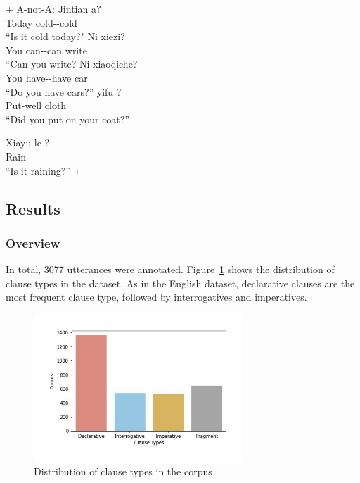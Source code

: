 + A-not-A: 
\bxl
\gll Jintian  a?\\
Today cold-\Neg-cold \Sfp{}\\
\trans ``Is it cold today?" \hfill {}
\ex 
\gll Ni  xiezi?\\
You can-\Neg-can write\\
\trans ``Can you write? \hfill {}
\ex \gll Ni  xiaoqiche?\\
You have-\Neg-have car\\
\trans ``Do you have cars?'' \hfill {}
\ex 
\gll {} yifu ?\\
Put-well cloth \Neg{}\\
\trans ``Did you put on your coat?'' \hfill {}
\exl
\eex

\gll Xiayu le ?\\
Rain \Asp{} \\
\trans ``Is it raining?'' \hfill +
\eex

\subsection{Results}
\label{sec:mancl:corpus:results}

\subsubsection{Overview}
\label{sec:mancl:corpus:results:mapping}

In total, 3077 utterances were annotated. Figure~\ref{fig:man-real-cldist} shows the distribution of clause types in the dataset. As in the English dataset, declarative clauses are the most frequent clause type, followed by interrogatives and imperatives. 

\begin{figure}[H]
    \centering
    \includegraphics[width=0.7\textwidth]{figures/man-real-cldist.jpg}
    \caption{Distribution of clause types in the corpus}
    \label{fig:man-real-cldist}
\end{figure}


